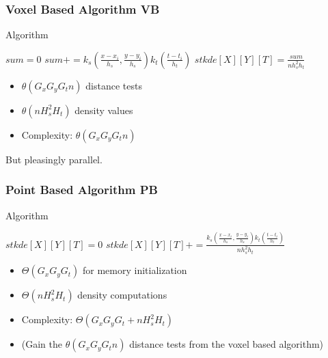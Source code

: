 \documentclass{beamer}
\begin{document}
\begin{frame}[fragile]
  \frametitle{Voxel Based Algorithm \textsc{VB}}

  \begin{block}{Algorithm}
    \begin{algorithmic}
      \State $sum = 0$
      \State $sum += k_s(\frac{x-x_i}{h_s},\frac{y-y_i}{h_s}) k_t(\frac{t-t_i}{h_t})$
      \EndIf
      \EndFor
      \State $stkde[X][Y][T] = \frac{sum}{n h_s^2h_t}$
      \EndFor
    \end{algorithmic}
  \end{block}

  \begin{itemize}
  \item $\theta(G_x G_y G_t n)$ distance tests
  \item $\theta(n H_s^2 H_t )$ density values
  \item Complexity: $\theta(G_x G_y G_t n )$
  \end{itemize}

  But pleasingly parallel.    
\end{frame}

\begin{frame}
  \frametitle{Point Based Algorithm \textsc{PB}}
  
  \begin{block}{Algorithm}
    \begin{algorithmic}
        \State $stkde[X][Y][T] = 0$
      \EndFor
                \State $stkde[X][Y][T] += \frac{k_s(\frac{x-x_i}{h_s},\frac{y-y_i}{h_s}) k_t(\frac{t-t_i}{h_t})}{n h_s^2h_t}$
              \EndIf
            \EndFor
          \EndFor
        \EndFor
      \EndFor
    \end{algorithmic}
  \end{block}
    
  \begin{itemize}
  \item $\Theta(G_x G_y G_t)$ for memory initialization
  \item $\Theta(n H_s^2 H_t)$ density computations
  \item Complexity:  $\Theta(G_x G_y G_t + n H_s^2 H_t)$
  \item (Gain the $\theta(G_x G_y G_t n)$ distance tests from the voxel based algorithm)
  \end{itemize}
\end{frame}
\end{document}

